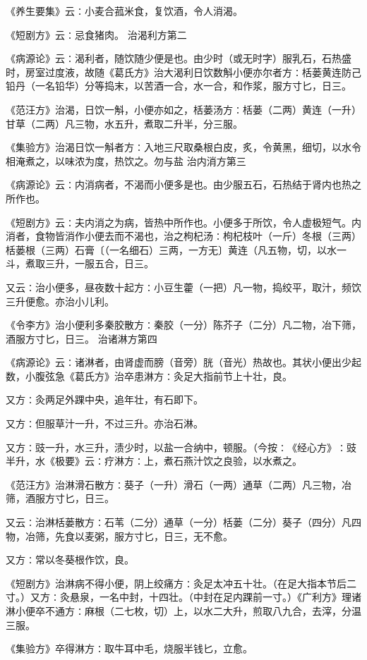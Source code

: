 \documentclass[a4paper,12pt,UTF8,twoside]{ctexbook}
\begin{document}
《养生要集》云∶小麦合菰米食，复饮酒，令人消渴。

《短剧方》云∶忌食猪肉。
治渴利方第二

《病源论》云∶渴利者，随饮随少便是也。由少时（或无时字）服乳石，石热盛时，房室过度液，故随《葛氏方》治大渴利日饮数斛小便亦尔者方∶栝蒌黄连防己铅丹（一名铅华）分等捣末，以苦酒一合，水一合，和作浆，服方寸匕，日三。

《范汪方》治渴，日饮一斛，小便亦如之，栝蒌汤方∶栝蒌（二两）黄连（一升）甘草（二两）凡三物，水五升，煮取二升半，分三服。

《集验方》治渴日饮一斛者方∶入地三尺取桑根白皮，炙，令黄黑，细切，以水令相淹煮之，以味浓为度，热饮之。勿与盐
治内消方第三

《病源论》云∶内消病者，不渴而小便多是也。由少服五石，石热结于肾内也热之所作也。

《短剧方》云∶夫内消之为病，皆热中所作也。小便多于所饮，令人虚极短气。内消者，食物皆消作小便去而不渴也，治之枸杞汤∶枸杞枝叶（一斤）冬根（三两）栝蒌根（三两）石膏〔（一名细石）三两，一方无〕黄连（凡五物，切，以水一斗，煮取三升，一服五合，日三。

又云∶治小便多，昼夜数十起方∶小豆生藿（一把）凡一物，捣绞平，取汁，频饮三升便愈。亦治小儿利。

《令李方》治小便利多秦胶散方∶秦胶（一分）陈芥子（二分）凡二物，冶下筛，酒服方寸匕，日三。
治诸淋方第四

《病源论》云∶诸淋者，由肾虚而膀（音旁）胱（音光）热故也。其状小便出少起数，小腹弦急《葛氏方》治卒患淋方∶灸足大指前节上十壮，良。

又方∶灸两足外踝中央，追年壮，有石即下。

又方∶但服草汁一升，不过三升。亦治石淋。

又方∶豉一升，水三升，渍少时，以盐一合纳中，顿服。（今按∶《经心方》∶豉半升，水《极要》云∶疗淋方∶上，煮石燕汁饮之良验，以水煮之。

《范汪方》治淋滑石散方∶葵子（一升）滑石（一两）通草（二两）凡三物，冶筛，酒服方寸匕，日三。

又云∶治淋栝蒌散方∶石苇（二分）通草（一分）栝蒌（二分）葵子（四分）凡四物，冶筛，先食以麦粥，服方寸匕，日三，无不愈。

又方∶常以冬葵根作饮，良。

《短剧方》治淋病不得小便，阴上绞痛方∶灸足太冲五十壮。（在足大指本节后二寸。）又方∶灸悬泉，一名中封，十四壮。（中封在足内踝前一寸。）《广利方》理诸淋小便卒不通方∶麻根（二七枚，切）上，以水二大升，煎取八九合，去滓，分温三服。

《集验方》卒得淋方∶取牛耳中毛，烧服半钱匕，立愈。
\end{document}

